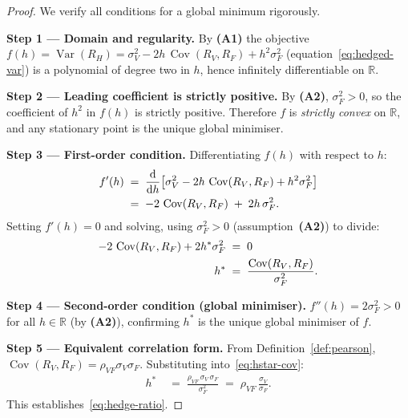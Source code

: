 \documentclass[12pt,openany]{book}
\newcommand{\R}{\mathbb{R}}
\numberwithin{equation}{chapter}
\theoremstyle{plain}
\theoremstyle{definition}
\theoremstyle{remark}
\numberwithin{equation}{chapter}
\theoremstyle{plain}
\DeclareMathOperator{\Var}{Var}
\DeclareMathOperator{\Cov}{Cov}
\begin{document}
\begin{proof}
We verify all conditions for a global minimum rigorously.

\medskip
\noindent\textbf{Step 1 — Domain and regularity.}
By \textbf{(A1)} the objective
$f(h) = \Var(R_H) = \sigma_V^2 - 2h\,\Cov(R_V,R_F) + h^2\sigma_F^2$
(equation~\eqref{eq:hedged-var}) is a polynomial of degree two in $h$,
hence infinitely differentiable on $\R$.

\medskip
\noindent\textbf{Step 2 — Leading coefficient is strictly positive.}
By \textbf{(A2)}, $\sigma_F^2 > 0$, so the coefficient of $h^2$
in $f(h)$ is strictly positive.
Therefore $f$ is \emph{strictly convex} on $\R$, and any stationary
point is the unique global minimiser.

\medskip
\noindent\textbf{Step 3 — First-order condition.}
Differentiating $f(h)$ with respect to $h$:
\begin{align}
  f'(h)
    &\;=\; \frac{\mathrm{d}}{\mathrm{d}h}
           \!\left[
             \sigma_V^2 - 2h\,\Cov(R_V,R_F) + h^2\sigma_F^2
           \right]
  \notag\\
    &\;=\; -2\,\Cov(R_V,R_F) \;+\; 2h\,\sigma_F^2.
  \label{eq:foc}
\end{align}
Setting $f'(h) = 0$ and solving, using $\sigma_F^2 > 0$
(assumption~\textbf{(A2)}) to divide:
\begin{align}
  -2\,\Cov(R_V,R_F) + 2h^*\sigma_F^2 &\;=\; 0
  \notag\\
  h^* &\;=\; \frac{\Cov(R_V,R_F)}{\sigma_F^2}.
  \label{eq:hstar-cov}
\end{align}

\medskip
\noindent\textbf{Step 4 — Second-order condition (global minimiser).}
$f''(h) = 2\sigma_F^2 > 0$ for all $h \in \R$ (by \textbf{(A2)}),
confirming $h^*$ is the unique global minimiser of $f$.

\medskip
\noindent\textbf{Step 5 — Equivalent correlation form.}
From Definition~\ref{def:pearson}, $\Cov(R_V,R_F) = \rho_{VF}\sigma_V\sigma_F$.
Substituting into~\eqref{eq:hstar-cov}:
\begin{align}
  h^*
    &\;=\; \frac{\rho_{VF}\,\sigma_V\,\sigma_F}{\sigma_F^2}
    \;=\; \rho_{VF}\,\frac{\sigma_V}{\sigma_F}.
  \label{eq:hstar-rho}
\end{align}
This establishes~\eqref{eq:hedge-ratio}.


\end{proof}
\end{document}
